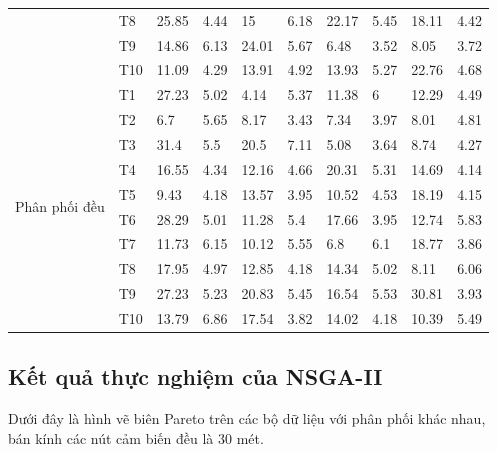 \documentclass{hust}
\begin{document}
\begin{center}
\begin{table}[htb]
\begin{adjustwidth}{-1.8cm}{}
\begin{tabular}{|l|l|l|l|l|l|l|l|l|l|}
	&T8	&25.85	&4.44	&15	&6.18	&22.17	&5.45	&18.11	&4.42	\\
	&T9	&14.86	&6.13	&24.01	&5.67	&6.48	&3.52	&8.05	&3.72	\\
	&T10	&11.09	&4.29	&13.91	&4.92	&13.93	&5.27	&22.76	&4.68	\\ \hline
	\multirow{10}{*}{Phân phối đều}      
	&T1	&27.23	&5.02	&4.14	&5.37	&11.38	&6	&12.29	&4.49	\\
	&T2	&6.7	&5.65	&8.17	&3.43	&7.34	&3.97	&8.01	&4.81	\\
	&T3	&31.4	&5.5	&20.5	&7.11	&5.08	&3.64	&8.74	&4.27	\\
	&T4	&16.55	&4.34	&12.16	&4.66	&20.31	&5.31	&14.69	&4.14	\\
	&T5	&9.43	&4.18	&13.57	&3.95	&10.52	&4.53	&18.19	&4.15	\\
	&T6	&28.29	&5.01	&11.28	&5.4	&17.66	&3.95	&12.74	&5.83	\\
	&T7	&11.73	&6.15	&10.12	&5.55	&6.8	&6.1	&18.77	&3.86	\\
	&T8	&17.95	&4.97	&12.85	&4.18	&14.34	&5.02	&8.11	&6.06	\\
	&T9	&27.23	&5.23	&20.83	&5.45	&16.54	&5.53	&30.81	&3.93	\\
	&T10	&13.79	&6.86	&17.54	&3.82	&14.02	&4.18	&10.39	&5.49	\\ \hline
\end{tabular}
\end{adjustwidth}
\end{table}
\end{center}

\subsection{Kết quả thực nghiệm của \gls{NSGA-II}}
Dưới đây là hình vẽ biên Pareto trên các bộ dữ liệu với phân phối khác nhau, bán kính các nút cảm biến đều là 30 mét.
\end{document}
